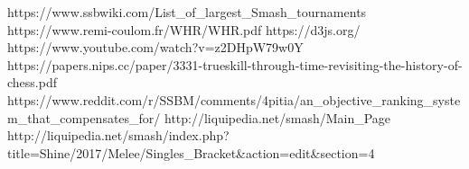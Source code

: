\documentclass[10pt]{article}
\theoremstyle{definition}
\theoremstyle{remark}
\begin{document}
\begin{thebibliography}{7}
 https://www.ssbwiki.com/List\_of\_largest\_Smash\_tournaments
 https://www.remi-coulom.fr/WHR/WHR.pdf 
 https://d3js.org/
 https://www.youtube.com/watch?v=z2DHpW79w0Y
 https://papers.nips.cc/paper/3331-trueskill-through-time-revisiting-the-history-of-chess.pdf
 https://www.reddit.com/r/SSBM/comments/4pitia/an\_objective\_ranking\_system\_that\_compensates\_for/
 http://liquipedia.net/smash/Main\_Page
 http://liquipedia.net/smash/index.php?title=Shine/2017/Melee/Singles\_Bracket\&action=edit\&section=4
\end{thebibliography}
\end{document}
